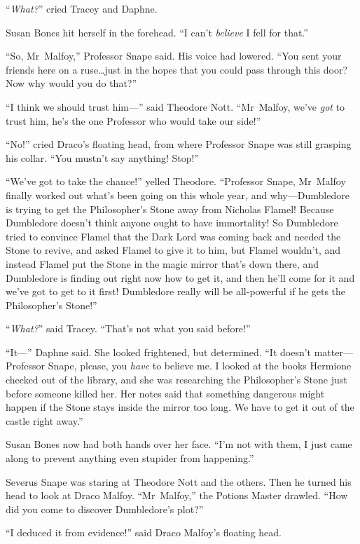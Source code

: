 “\emph{What?}” cried Tracey and Daphne.

Susan Bones hit herself in the forehead. “I can’t \emph{believe} I fell for that.”

“So, Mr~Malfoy,” Professor Snape said. His voice had lowered. “You sent your friends here on a ruse…just in the hopes that you could pass through this door? Now why would you do that?”

“I think we should trust him—” said Theodore Nott. “Mr~Malfoy, we’ve \emph{got} to trust him, he’s the one Professor who would take our side!”

“No!” cried Draco’s floating head, from where Professor Snape was still grasping his collar. “You mustn’t say anything! Stop!”

“We’ve got to take the chance!” yelled Theodore. “Professor Snape, Mr~Malfoy finally worked out what’s been going on this whole year, and why—Dumbledore is trying to get the Philosopher’s Stone away from Nicholas Flamel! Because Dumbledore doesn’t think anyone ought to have immortality! So Dumbledore tried to convince Flamel that the Dark Lord was coming back and needed the Stone to revive, and asked Flamel to give it to him, but Flamel wouldn’t, and instead Flamel put the Stone in the magic mirror that’s down there, and Dumbledore is finding out right now how to get it, and then he’ll come for it and we’ve got to get to it first! Dumbledore really will be all-powerful if he gets the Philosopher’s Stone!”

“\emph{What?}” said Tracey. “That’s not what you said before!”

“It—” Daphne said. She looked frightened, but determined. “It doesn’t matter—Professor Snape, please, you \emph{have} to believe me. I looked at the books Hermione checked out of the library, and she was researching the Philosopher’s Stone just before someone killed her. Her notes said that something dangerous might happen if the Stone stays inside the mirror too long. We have to get it out of the castle right away.”

Susan Bones now had both hands over her face. “I’m not with them, I just came along to prevent anything even stupider from happening.”

Severus Snape was staring at Theodore Nott and the others. Then he turned his head to look at Draco Malfoy. “Mr~Malfoy,” the Potions Master drawled. “How did you come to discover Dumbledore’s plot?”

“I deduced it from evidence!” said Draco Malfoy’s floating head.

